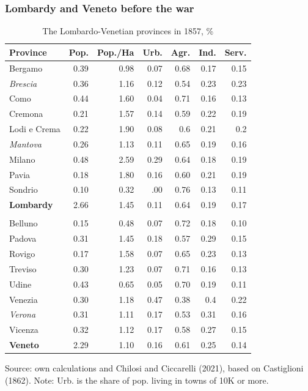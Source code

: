 \documentclass[10pt]{beamer}
\begin{document}
\begin{frame}
    \frametitle{Lombardy and Veneto before the war}

\begin{table}[!h]
\caption{\label{tab:rd_analysis_dummy}The Lombardo-Venetian provinces in 1857, \%}
\centering
\fontsize{8}{8}\selectfont

    \begin{tabular}{l r r r r r r}  
        \toprule
        Province & Pop. & Pop./Ha & Urb. & Agr. & Ind. & Serv.    \\ 
        \midrule
        Bergamo & 0.39 & 0.98 & 0.07 & 0.68 & 0.17 & 0.15 \\
        \textit{Brescia} & 0.36 & 1.16 & 0.12 & 0.54 & 0.23 & 0.23 \\
        Como & 0.44 & 1.60 & 0.04 & 0.71 & 0.16 & 0.13 \\
        Cremona & 0.21 & 1.57 & 0.14 & 0.59 & 0.22 & 0.19 \\
        Lodi e Crema & 0.22 & 1.90 & 0.08 & 0.6 & 0.21 & 0.2 \\
        \textit{Mantova} & 0.26 & 1.13 & 0.11 & 0.65 & 0.19 & 0.16 \\
        Milano & 0.48 & 2.59 & 0.29 & 0.64 & 0.18 & 0.19 \\
        Pavia & 0.18 & 1.80 & 0.16 & 0.60 & 0.21 & 0.19 \\
        Sondrio & 0.10 & 0.32 & .00 & 0.76 & 0.13 & 0.11 \\
        \textbf{Lombardy} & 2.66 & 1.45 & 0.11 & 0.64 & 0.19 & 0.17 \\
         &  & &  &  &  \\
        Belluno & 0.15 & 0.48 & 0.07 & 0.72 & 0.18 & 0.10 \\
        Padova & 0.31 &1.45 & 0.18 & 0.57 & 0.29 & 0.15 \\
        Rovigo & 0.17 & 1.58 & 0.07 & 0.65 & 0.23 & 0.13 \\
        Treviso & 0.30 & 1.23 & 0.07 & 0.71 & 0.16 & 0.13 \\
        Udine & 0.43 & 0.65 & 0.05 & 0.70 & 0.19 & 0.11 \\
        Venezia & 0.30 & 1.18 & 0.47 & 0.38 & 0.4 & 0.22 \\
        \textit{Verona} & 0.31 & 1.11 & 0.17 & 0.53 & 0.31 & 0.16 \\
        Vicenza & 0.32 & 1.12 & 0.17 & 0.58 & 0.27 & 0.15 \\
        \textbf{Veneto} & 2.29 & 1.10 & 0.16 & 0.61 & 0.25 & 0.14 \\
        \bottomrule    
    \end{tabular}
    
    Source: own calculations and Chilosi and Ciccarelli (2021), based on Castiglioni (1862). Note: Urb. is the share of pop. living in towns of 10K or more.

    
\end{table}

    
\end{frame}
\end{document}
